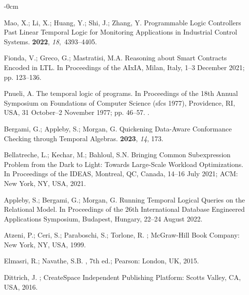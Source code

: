 \documentclass[information,article,accept,pdftex,oneauthor]{Definitions/mdpi}
\begin{document}
\begin{adjustwidth}{-\extralength}{0cm}
\begin{thebibliography}{999}
Mao, X.; Li, X.; Huang, Y.; Shi, J.; Zhang, Y.
\newblock Programmable Logic Controllers Past Linear Temporal Logic for
  Monitoring Applications in Industrial Control Systems.
 {\bf 2022}, {\em
  18},~4393--4405.

Fionda, V.; Greco, G.; Mastratisi, M.A.
\newblock Reasoning about Smart Contracts Encoded in LTL.
\newblock In Proceedings of the AIxIA, {Milan, Italy, 1--3 December}  2021; pp. 123--136.

Pnueli, A.
\newblock The temporal logic of programs.
\newblock In Proceedings of the 18th Annual Symposium on Foundations of
  Computer Science (sfcs 1977), {Providence, RI, USA, 31 October--2 November}  1977; pp. 46--57.
.

Bergami, G.; Appleby, S.; Morgan, G.
\newblock Quickening Data-Aware Conformance Checking through Temporal Algebras.
 {\bf 2023}, {\em 14}, {173}.

Bellatreche, L.; Kechar, M.; Bahloul, S.N.
\newblock Bringing Common Subexpression Problem from the Dark to Light: Towards
  Large-Scale Workload Optimizations.
\newblock In Proceedings of the {IDEAS}, {Montreal, QC, Canada, 14--16 July} 2021; {ACM}:  {New York, NY, USA,}   2021.

Appleby, S.; Bergami, G.; Morgan, G.
\newblock Running Temporal Logical Queries on the Relational Model. {In Proceedings of the 26th International Database Engineered Applications Symposium, Budapest, Hungary, 22--24 August} {2022}.

Atzeni, P.; Ceri, S.; Paraboschi, S.; Torlone, R.
;
  McGraw-Hill Book Company:  {New York, NY, USA}, 1999.

Elmasri, R.; Navathe, S.B.
, 7th ed.; Pearson:  {London, UK,}   2015.

Dittrich, J.
; CreateSpace
  Independent Publishing Platform: {Scotts Valley, CA, USA},  2016.


\end{thebibliography}
\end{adjustwidth}
\end{document}
